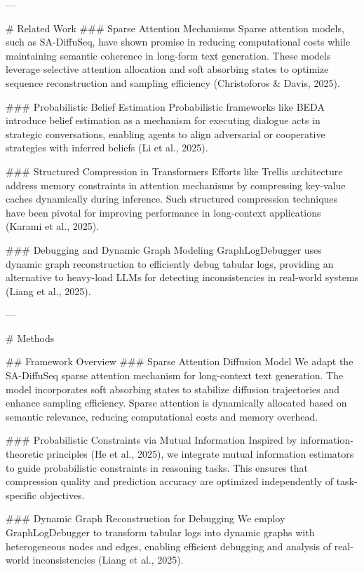 ---

# Related Work  
### Sparse Attention Mechanisms  
Sparse attention models, such as SA-DiffuSeq, have shown promise in reducing computational costs while maintaining semantic coherence in long-form text generation. These models leverage selective attention allocation and soft absorbing states to optimize sequence reconstruction and sampling efficiency (Christoforos & Davis, 2025).  

### Probabilistic Belief Estimation  
Probabilistic frameworks like BEDA introduce belief estimation as a mechanism for executing dialogue acts in strategic conversations, enabling agents to align adversarial or cooperative strategies with inferred beliefs (Li et al., 2025).  

### Structured Compression in Transformers  
Efforts like Trellis architecture address memory constraints in attention mechanisms by compressing key-value caches dynamically during inference. Such structured compression techniques have been pivotal for improving performance in long-context applications (Karami et al., 2025).  

### Debugging and Dynamic Graph Modeling  
GraphLogDebugger uses dynamic graph reconstruction to efficiently debug tabular logs, providing an alternative to heavy-load LLMs for detecting inconsistencies in real-world systems (Liang et al., 2025).  

---

# Methods  

## Framework Overview  
### Sparse Attention Diffusion Model  
We adapt the SA-DiffuSeq sparse attention mechanism for long-context text generation. The model incorporates soft absorbing states to stabilize diffusion trajectories and enhance sampling efficiency. Sparse attention is dynamically allocated based on semantic relevance, reducing computational costs and memory overhead.  

### Probabilistic Constraints via Mutual Information  
Inspired by information-theoretic principles (He et al., 2025), we integrate mutual information estimators to guide probabilistic constraints in reasoning tasks. This ensures that compression quality and prediction accuracy are optimized independently of task-specific objectives.  

### Dynamic Graph Reconstruction for Debugging  
We employ GraphLogDebugger to transform tabular logs into dynamic graphs with heterogeneous nodes and edges, enabling efficient debugging and analysis of real-world inconsistencies (Liang et al., 2025).  

